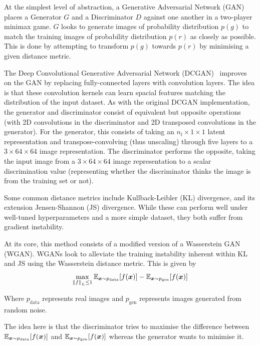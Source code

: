 At the simplest level of abstraction, a Generative Adversarial Network (GAN)~\cite{goodfellow2014generative} places a Generator $G$ and a Discriminator $D$ against one another in a two-player minimax game.
$G$ looks to generate images of probability distribution $p(g)$ to match the training images of probability distribution $p(r)$ as closely as possible.
This is done by attempting to transform $p(g)$ towards $p(r)$ by minimising a given distance metric.

The Deep Convolutional Generative Adversarial Network (DCGAN)~\cite{radford2015unsupervised} improves on the GAN by replacing fully-connected layers with convolution layers.
The idea is that these convolution kernels can learn spacial features matching the distribution of the input dataset.
As with the original DCGAN implementation, the generator and discriminator consist of equivalent but opposite operations (with 2D convolutions in the discriminator and 2D transposed convolutions in the generator).
For the generator, this consists of taking an $n_l \times 1 \times 1$ latent representation and transpose-convolving (thus unscaling) through five layers to a $3 \times 64 \times 64$ image representation.
The discriminator performs the opposite, taking the input image from a $3 \times 64 \times 64$ image representation to a scalar discrimination value (representing whether the discriminator thinks the image is from the training set or not).

Some common distance metrics include Kullback-Leibler (KL) divergence, and its extension Jensen-Shannon (JS) divergence.
While these can perform well under well-tuned hyperparameters and a more simple dataset, they both suffer from gradient instability.

At its core, this method consists of a modified version of a Wasserstein GAN~\cite{arjovsky2017wasserstein} (WGAN).
WGANs look to alleviate the training instability inherent within KL and JS using the Wasserstein distance metric.
This is given by
\begin{equation}
    \max_{\left\lVert f\right\rVert_L \leq 1} \mathbb{E}_{{\bm{x}} \sim p_{\textrm{data}}}[f({\bm{x}})] - \mathbb{E}_{{\bm{x}} \sim p_{\textrm{gen}}}[f({\bm{x}})]
    \label{eq:wasserstein}
\end{equation}

Where $p_{\textrm{data}}$ represents real images and $p_{\textrm{gen}}$ represents images generated from random noise.

The idea here is that the discriminator tries to maximise the difference between $\mathbb{E}_{{\bm{x}} \sim p_{\textrm{data}}}[f({\bm{x}})]$ and $\mathbb{E}_{{\bm{x}} \sim p_{\textrm{gen}}}[f({\bm{x}})]$ whereas the generator wants to minimise it.

